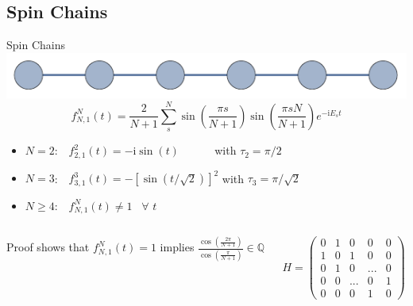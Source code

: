 \documentclass{beamer}
\begin{document}
\subsection{Spin Chains}
\begin{frame}[t]{Spin Chains}
	\includegraphics[trim=0 0 0 0, width=\textwidth]{Images/chain6_nolabels}\\
	\[f_{N,1}^N(t) = \frac{2}{N+1}\sum_{s}^N\sin\left(\frac{\pi s}{N+1}\right)\sin\left(\frac{\pi sN}{N+1}\right)e^{-\text{i}E_s t} \]
	\begin{itemize}
		\item $N=2$: \,\,\,\,$f_{2,1}^2(t) = -\text{i}\sin(t)$ \,\,\,\,\,\,\,\,\,\,\,\,\,\,\,\,\,with $\tau_2 = \pi/2$
		\item $N=3$: \,\,\,\,$f_{3,1}^3(t) = -\left[\sin(t/\sqrt{2})\right]^2$ with $\tau_3 = \pi/\sqrt{2}$
		\item $N \geq 4$: \,\,\,\,$f_{N,1}^N(t) \neq 1$\,\,\, $\forall$\,\,$t$
	\end{itemize}
	\begin{columns}[T]
		\begin{column}{0.5\textwidth}
			\centering
			\begin{exampleblock}{}
			\setlength\abovedisplayskip{-8pt}
			\begin{center}
		Proof shows that $f_{N,1}^N(t) = 1$ implies $\frac{\cos\left(\frac{2\pi}{N+1}\right)}{\cos\left(\frac{\pi}{N+1}\right)} \in \mathbb{Q}$
			\end{center}
			\end{exampleblock}
		\end{column}
		\begin{column}{0.5\textwidth}
			\centering
        $H = \begin{pmatrix}
			0 & 1 & 0 & 0 & 0 \\
			1 & 0 & 1 & 0 & 0 \\
			0 & 1 & 0 & ... & 0 \\
			0 & 0 & ... & 0 & 1 \\
			0 & 0 & 0 & 1 & 0 
		\end{pmatrix}$
		\end{column}
	\end{columns}
\end{frame}
\end{document}
